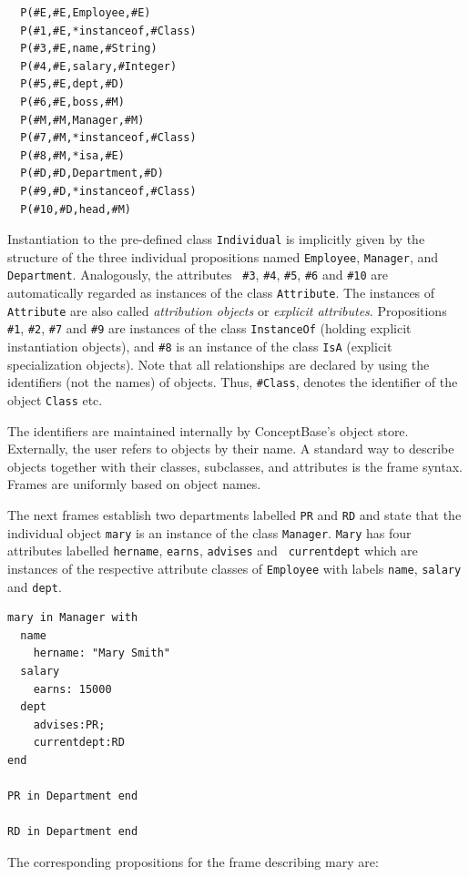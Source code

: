 \begin{verbatim}
  P(#E,#E,Employee,#E)
  P(#1,#E,*instanceof,#Class)
  P(#3,#E,name,#String)
  P(#4,#E,salary,#Integer)
  P(#5,#E,dept,#D)
  P(#6,#E,boss,#M)
  P(#M,#M,Manager,#M)
  P(#7,#M,*instanceof,#Class)
  P(#8,#M,*isa,#E)
  P(#D,#D,Department,#D)
  P(#9,#D,*instanceof,#Class)
  P(#10,#D,head,#M)
\end{verbatim}

Instantiation to the pre-defined class {\tt Individual} is implicitly given by the
structure of the three individual propositions named {\tt Employee}, {\tt Manager},
 and {\tt Department}.  Analogously, the attributes {\tt
  \#3}, {\tt \#4}, {\tt \#5}, {\tt \#6} and {\tt \#10} are
automatically regarded as instances of the class {\tt Attribute}. 
The instances of {\tt Attribute} are also called {\em attribution objects\/}
or {\em explicit attributes}.
Propositions {\tt \#1}, {\tt \#2}, {\tt \#7} and {\tt \#9} are
instances of the class {\tt InstanceOf} (holding explicit instantiation objects), and {\tt \#8} is an instance
of the class {\tt IsA} (explicit specialization objects). Note that all relationships are declared by
using the identifiers (not the names) of objects. Thus, {\tt \#Class},
denotes the identifier of the object {\tt Class} etc.

The identifiers are maintained internally by ConceptBase's object store. Externally,
the user refers to objects by their name. A standard way to describe objects together
with their classes, subclasses, and attributes is the frame syntax. Frames
are uniformly based on object names.


The next frames establish two departments labelled {\tt PR} and
{\tt RD} and state that the individual object {\tt mary} is an
instance of the class {\tt Manager}. {\tt Mary} has four attributes
labelled {\tt hername}, {\tt earns}, {\tt advises} and {\tt
  currentdept} which are instances of the respective attribute classes
of {\tt Employee} with labels {\tt name}, {\tt salary} and {\tt dept}.


\begin{verbatim}
mary in Manager with
  name
    hername: "Mary Smith"
  salary
    earns: 15000
  dept
    advises:PR;
    currentdept:RD
end

PR in Department end

RD in Department end
\end{verbatim}


The corresponding propositions for the frame describing mary are:


